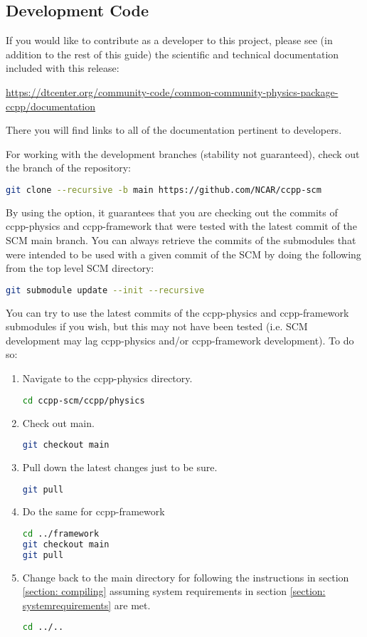 \subsection{Development Code}
\label{section: development_code}

If you would like to contribute as a developer to this project, please see (in addition to the rest of this guide) the scientific and technical documentation included with this release:

\url{https://dtcenter.org/community-code/common-community-physics-package-ccpp/documentation}

There you will find links to all of the documentation pertinent to developers.

For working with the development branches (stability not guaranteed), check out the  branch of the repository:
\begin{lstlisting}[language=bash]
git clone --recursive -b main https://github.com/NCAR/ccpp-scm
\end{lstlisting}
By using the  option, it guarantees that you are checking out the commits of ccpp-physics and ccpp-framework that were tested with the latest commit of the SCM main branch. You can always retrieve the commits of the submodules that were intended to be used with a given commit of the SCM by doing the following from the top level SCM directory:
\begin{lstlisting}[language=bash]
git submodule update --init --recursive
\end{lstlisting}
You can try to use the latest commits of the ccpp-physics and ccpp-framework submodules if you wish, but this may not have been tested (i.e. SCM development may lag ccpp-physics and/or ccpp-framework development). To do so:
\begin{enumerate}
\item Navigate to the ccpp-physics directory.
\begin{lstlisting}[language=bash]
cd ccpp-scm/ccpp/physics
\end{lstlisting}
\item Check out main.
\begin{lstlisting}[language=bash]
git checkout main
\end{lstlisting}
\item Pull down the latest changes just to be sure.
\begin{lstlisting}[language=bash]
git pull
\end{lstlisting}
\item Do the same for ccpp-framework
\begin{lstlisting}[language=bash]
cd ../framework
git checkout main
git pull
\end{lstlisting}
\item Change back to the main directory for following the instructions in section \ref{section: compiling} assuming system requirements in section \ref{section: systemrequirements} are met.
\begin{lstlisting}[language=bash]
cd ../..
\end{lstlisting}
\end{enumerate}


